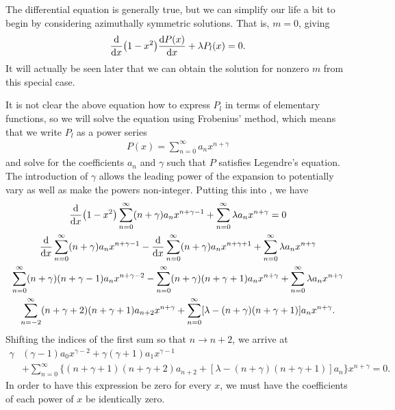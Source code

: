The differential equation  is generally true, but we can simplify our life a bit to begin by considering azimuthally symmetric solutions.
That is, $m = 0$, giving
\begin{eqnarray}
    \label{eq:legendre-m0}
    \dv{x} (1 - x^2) \dv{P(x)}{x} + \lambda P_{l}(x) = 0
.\end{eqnarray}
It will actually be seen later that we can obtain the solution for nonzero $m$ from this special case.

It is not clear the above equation how to express $P_{l}$ in terms of elementary functions, so we will solve the equation using Frobenius' method, which means that we write $P_{l}$ as a power series
\begin{align}
    P(x) = \sum_{n=0}^{\infty} a_{n} x^{n + \gamma}
\end{align}
and solve for the coefficients $a_{n}$ and $\gamma$ such that $P$ satisfies Legendre's equation.
The introduction of $\gamma$ allows the leading power of the expansion to potentially vary as well as make the powers non-integer.
Putting this into , we have
\begin{gather}
    \dv{x}(1 - x^2) \sum_{n=0}^{\infty} (n+\gamma) a_{n} x^{n+\gamma-1} + \sum_{n=0}^{\infty} \lambda a_{n} x^{n+\gamma} = 0 \nonumber \\
    \dv{x} \sum_{n=0}^{\infty} (n+\gamma) a_{n} x^{n+\gamma-1} - \dv{x} \sum_{n=0}^{\infty} (n+\gamma) a_{n} x^{n+\gamma+1} + \sum_{n=0}^{\infty} \lambda a_{n} x^{n+\gamma} \nonumber \\
    \sum_{n=0}^{\infty} (n+\gamma) (n+\gamma-1) a_{n} x^{n+\gamma-2} - \sum_{n=0}^{\infty} (n+\gamma)(n+\gamma+1) a_{n} x^{n+\gamma} + \sum_{n=0}^{\infty} \lambda a_{n} x^{n + \gamma} \nonumber \\
    \sum_{n=-2}^{\infty} (n+\gamma+2)(n+\gamma+1) a_{n+2} x^{n+\gamma} + \sum_{n=0}^{\infty} [ \lambda - (n+\gamma)(n+\gamma+1) ] a_{n} x^{n+\gamma}
.\end{gather}
Shifting the indices of the first sum so that $n \rightarrow n+2$, we arrive at 
\begin{align}
    \gamma &(\gamma - 1) a_{0} x^{\gamma - 2} + \gamma(\gamma + 1) a_{1} x^{\gamma - 1} \nonumber \\
                                             &+ \sum_{n=0}^{\infty} \Big\{ (n+\gamma+1)(n+\gamma+2)a_{n+2} + [ \lambda - (n+\gamma)(n+\gamma+1) ] a_{n} \Big\} x^{n+\gamma} = 0
.\end{align}
In order to have this expression be zero for every $x$, we must have the coefficients of each power of $x$ be identically zero.
